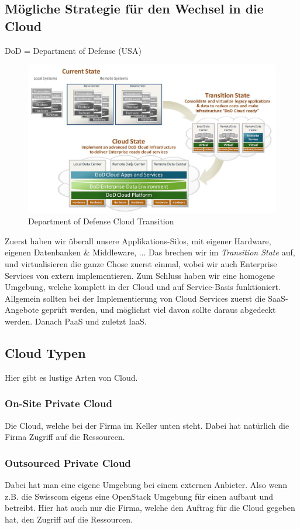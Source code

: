 \subsection{Mögliche Strategie für den Wechsel in die Cloud}
DoD = Department of Defense (USA)
\begin{figure}[h!]
\centering
\includegraphics[width=0.7\linewidth]{fig/dod_cloud_transition}
\caption{Department of Defense Cloud Transition}
\label{fig:dod_cloud_transition}
\end{figure}
Zuerst haben wir überall unsere Applikations-Silos, mit eigener Hardware, eigenen Datenbanken \& Middleware, ... Das brechen wir im \textit{Transition State} auf, und virtualisieren die ganze Chose zuerst einmal, wobei wir auch Enterprise Services von extern implementieren. Zum Schluss haben wir eine homogene Umgebung, welche komplett in der Cloud und auf Service-Basis funktioniert.\\
Allgemein sollten bei der Implementierung von Cloud Services zuerst die SaaS-Angebote geprüft werden, und möglichst viel davon sollte daraus abgedeckt werden. Danach PaaS und zuletzt IaaS.
\subsection{Cloud Typen}
Hier gibt es lustige Arten von Cloud.
\subsubsection{On-Site Private Cloud}
Die Cloud, welche bei der Firma im Keller unten steht. Dabei hat natürlich die Firma Zugriff auf die Ressourcen.
\subsubsection{Outsourced Private Cloud}
Dabei hat man eine eigene Umgebung bei einem externen Anbieter. Also wenn z.B. die Swisscom eigens eine OpenStack Umgebung für einen aufbaut und betreibt. Hier hat auch nur die Firma, welche den Auftrag für die Cloud gegeben hat, den Zugriff auf die Ressourcen.
